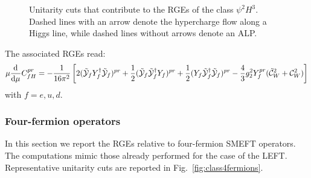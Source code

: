 \begin{figure}[h]
    \caption{Unitarity cuts that contribute to the RGEs of the class $\psi^2 H^3$. Dashed lines with an arrow denote the hypercharge flow along a Higgs line, while dashed lines without arrows denote an ALP.}
    \label{fig:classpsi2H3}
\end{figure}

The associated RGEs read:
%
\begin{equation}
 \mu \dv[]{}{\mu} {{C}}_{fH}^{pr} =-\frac{1}{16\pi^2}\left[ 2  ( \tilde{\mathcal{Y}}_f {Y}_f^\dagger \tilde{\mathcal{Y}}_f)^{pr} + \frac{1}{2} (\tilde{\mathcal{Y}}_f \tilde{\mathcal{Y}}_f^\dagger {Y}_f)^{pr} + \frac{1}{2} ({Y}_f \tilde{\mathcal{Y}}_f^\dagger \tilde{\mathcal{Y}}_f)^{pr} - \frac{4}{3}g_2^2 Y_f^{pr}
 (\tilde{\mathcal{C}}_{W}^2 +  \mathcal{C}_{W}^2)\right]
\end{equation}
%
with $f = e, u, d$.

\subsubsection{Four-fermion operators}

In this section we report the RGEs relative to four-fermion SMEFT operators. The computations mimic those already performed for the case of the LEFT. Representative unitarity cuts are reported in Fig.~\ref{fig:class4fermions}.


